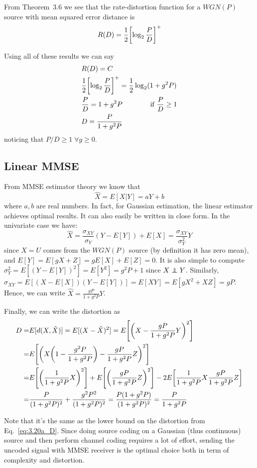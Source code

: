 From Theorem~3.6 we see that the rate-distortion function for a $WGN(P)$ source with mean squared error distance is
%
\begin{equation}
R(D) = \frac{1}{2} \qty[\log_2 \frac{P}{D}]^+
\end{equation}

Using all of these results we can say
%
\begin{align}\label{eq:3.20a_D}
\begin{split}
&R(D)=C\\
&\frac{1}{2} \qty[\log_2 \frac{P}{D}]^+ = \frac{1}{2} \log_2(1+g^2P) \\
&\frac{P}{D} = 1+g^2P \qquad\qquad \mbox{if } \frac{P}{D} \geq 1\\
&D= \frac{P}{1+g^2P}
\end{split}
\end{align}
%
noticing that $P/D \geq 1 \; \forall g \geq 0$.

\subsection{Linear MMSE}
From MMSE estimator theory we know that
%
\begin{equation}
\hat{X} = E[X|Y] = aY+b
\end{equation}
%
where $a,b$ are real numbers. In fact, for Gaussian estimation, the linear estimator achieves optimal results. It can also easily be written in close form. In the univariate case we have:
%
\begin{equation}
\hat{X} = \frac{\sigma_{XY}}{\sigma_Y} (Y-E[Y]) + E[X] = \frac{\sigma_{XY}}{\sigma_Y^2} Y
\end{equation}
%
since $X=U$ comes from the $WGN(P)$ source (by definition it has zero mean), and $E[Y]=E[gX+Z] = gE[X]+E[Z] = 0$. It is also simple to compute $\sigma_Y^2 = E[(Y-E[Y])^2] = E[Y^2] = g^2P+1$ since $X\independent Y$. Similarly, $\sigma_{XY} = E[(X-E[X])(Y-E[Y])] = E[XY] = E[gX^2+XZ] = gP$.\\
Hence, we can write $\hat{X} = \frac{gP}{1+g^2P}Y$.

Finally, we can write the distortion as
%
\begin{align}
\begin{split}
D =& E[d(X,\hat{X})] = E[(X-\hat{X})^2] = E \qty[\qty(X-\frac{gP}{1+g^2P}Y)^2]\\
=& E \qty[\qty( X \qty(1-\frac{g^2P}{1+g^2P}) - \frac{gP}{1+g^2P}Z)^2]\\
=& E \qty[\qty( \frac{1}{1+g^2P}X)^2] + E\qty[\qty( \frac{gP}{1+g^2P}Z)^2] - 2E\qty[ \frac{1}{1+g^2P}X \frac{gP}{1+g^2P}Z ]\\
=& \frac{P}{(1+g^2P)^2} + \frac{g^2P^2}{(1+g^2P)^2} = \frac{P(1+g^2P)}{(1+g^2P)^2} = \frac{P}{1+g^2P}
\end{split}
\end{align}

Note that it's the same as the lower bound on the distortion from Eq.~\eqref{eq:3.20a_D}. Since doing source coding on a Gaussian (thus continuous) source and then perform channel coding requires a lot of effort, sending the uncoded signal with MMSE receiver is the optimal choice both in term of complexity and distortion.

